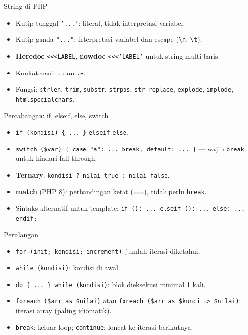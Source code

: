 \documentclass[handout]{beamer}
\begin{document}
\begin{frame}{String di PHP}
	\begin{itemize}
		\item Kutip tunggal \texttt{'...'}: literal, tidak interpretasi variabel.
		\item Kutip ganda \texttt{"..."}: interpretasi variabel dan escape (\texttt{\textbackslash n}, \texttt{\textbackslash t}).
		\item \textbf{Heredoc} \texttt{<<<LABEL}, \textbf{nowdoc} \texttt{<<<'LABEL'} untuk string multi-baris.
		\item Konkatenasi: \texttt{.} dan \texttt{.=}.
		\item Fungsi: \texttt{strlen}, \texttt{trim}, \texttt{substr}, \texttt{strpos}, \texttt{str\_replace}, \texttt{explode}, \texttt{implode}, \texttt{htmlspecialchars}.
	\end{itemize}
\end{frame}

\begin{frame}{Percabangan: if, elseif, else, switch}
	\begin{itemize}
		\item \texttt{if (kondisi) \{ ... \}} \texttt{elseif} \texttt{else}.
		\item \texttt{switch (\$var) \{ case "a": ... break; default: ... \}} — wajib \texttt{break} untuk hindari fall-through.
		\item \textbf{Ternary}: \texttt{kondisi ? nilai\_true : nilai\_false}.
		\item \textbf{match} (PHP 8): perbandingan ketat (\texttt{===}), tidak perlu \texttt{break}.
		\item Sintaks alternatif untuk template: \texttt{if (): ... elseif (): ... else: ... endif;}
	\end{itemize}
\end{frame}

\begin{frame}{Perulangan}
	\begin{itemize}
		\item \texttt{for (init; kondisi; increment)}: jumlah iterasi diketahui.
		\item \texttt{while (kondisi)}: kondisi di awal.
		\item \texttt{do \{ ... \} while (kondisi)}: blok dieksekusi minimal 1 kali.
		\item \texttt{foreach (\$arr as \$nilai)} atau \texttt{foreach (\$arr as \$kunci => \$nilai)}: iterasi array (paling idiomatik).
		\item \texttt{break}: keluar loop; \texttt{continue}: loncat ke iterasi berikutnya.
	\end{itemize}
\end{frame}
\end{document}
